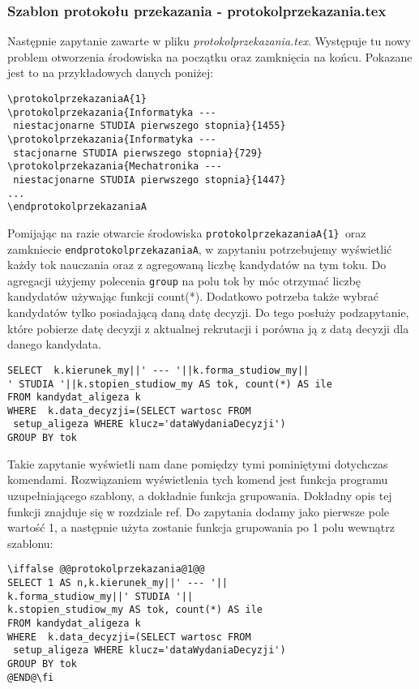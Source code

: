 \subsubsection*{Szablon protokołu przekazania -  protokolprzekazania.tex}
Następnie zapytanie zawarte w pliku \emph{protokolprzekazania.tex}. Występuje tu nowy problem otworzenia środowiska na początku oraz zamknięcia na końcu. Pokazane jest to na przykładowych danych poniżej:
 \begin{lstlisting}
\protokolprzekazaniaA{1}
\protokolprzekazania{Informatyka ---
 niestacjonarne STUDIA pierwszego stopnia}{1455}
\protokolprzekazania{Informatyka ---
 stacjonarne STUDIA pierwszego stopnia}{729}
\protokolprzekazania{Mechatronika ---
 niestacjonarne STUDIA pierwszego stopnia}{1447}
...
\endprotokolprzekazaniaA        
\end{lstlisting}
Pomijając na razie otwarcie środowiska \texttt{protokolprzekazaniaA\{1\} }oraz zamkniecie \texttt{endprotokolprzekazaniaA}, w zapytaniu potrzebujemy wyświetlić każdy tok nauczania oraz z agregowaną liczbę kandydatów na tym toku. Do agregacji użyjemy polecenia \texttt{group}  na polu tok by móc otrzymać liczbę kandydatów używając funkcji count(*). Dodatkowo potrzeba także wybrać kandydatów tylko posiadającą daną datę decyzji. Do tego posłuży podzapytanie, które pobierze datę decyzji z aktualnej rekrutacji i porówna ją z datą decyzji dla danego kandydata. 
 \begin{lstlisting}
SELECT  k.kierunek_my||' --- '||k.forma_studiow_my||
' STUDIA '||k.stopien_studiow_my AS tok, count(*) AS ile
FROM kandydat_aligeza k
WHERE  k.data_decyzji=(SELECT wartosc FROM
 setup_aligeza WHERE klucz='dataWydaniaDecyzji') 
GROUP BY tok
\end{lstlisting}
Takie zapytanie wyświetli nam dane pomiędzy tymi pominiętymi dotychczas komendami. 
Rozwiązaniem wyświetlenia tych komend jest funkcja programu uzupełniającego szablony, a dokładnie funkcja grupowania. Dokładny opis tej funkcji znajduje się w rozdziale ref. Do zapytania dodamy jako pierwsze pole wartość 1, a następnie użyta zostanie funkcja grupowania po 1 polu wewnątrz szablonu:
 \begin{lstlisting}
\iffalse @@protokolprzekazania@1@@
SELECT 1 AS n,k.kierunek_my||' --- '||
k.forma_studiow_my||' STUDIA '||
k.stopien_studiow_my AS tok, count(*) AS ile
FROM kandydat_aligeza k
WHERE  k.data_decyzji=(SELECT wartosc FROM
 setup_aligeza WHERE klucz='dataWydaniaDecyzji') 
GROUP BY tok
@END@\fi
\end{lstlisting}

